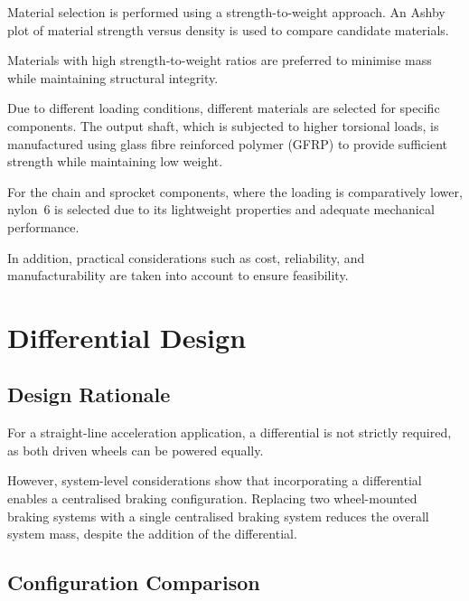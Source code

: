 \documentclass[11pt, a4paper]{report}
\numberwithin{equation}{section}
\begin{document}
Material selection is performed using a strength-to-weight approach. An Ashby plot of material strength versus density is used to compare candidate materials.

Materials with high strength-to-weight ratios are preferred to minimise mass while maintaining structural integrity.

Due to different loading conditions, different materials are selected for specific components. The output shaft, which is subjected to higher torsional loads, is manufactured using glass fibre reinforced polymer (GFRP) to provide sufficient strength while maintaining low weight.

For the chain and sprocket components, where the loading is comparatively lower, nylon~6 is selected due to its lightweight properties and adequate mechanical performance.

In addition, practical considerations such as cost, reliability, and manufacturability are taken into account to ensure feasibility.

\section{Differential Design}

\subsection{Design Rationale}

For a straight-line acceleration application, a differential is not strictly required, as both driven wheels can be powered equally.

However, system-level considerations show that incorporating a differential enables a centralised braking configuration. Replacing two wheel-mounted braking systems with a single centralised braking system reduces the overall system mass, despite the addition of the differential.
\subsection{Configuration Comparison}
\end{document}
